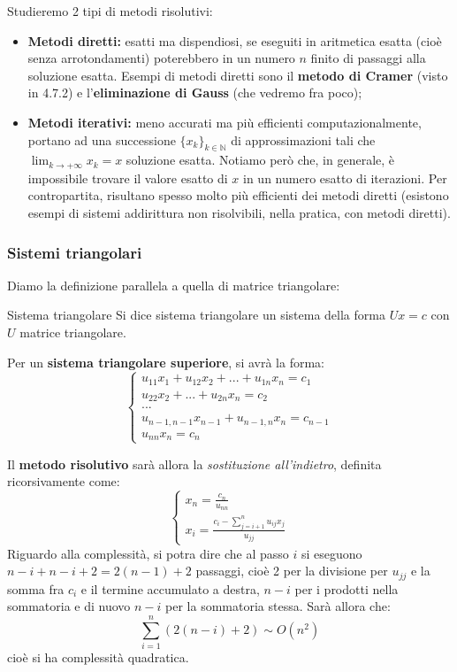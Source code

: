 \documentclass[a4paper,11pt]{article}
\begin{document}
Studieremo 2 tipi di metodi risolutivi:
\begin{itemize}
	\item \textbf{Metodi diretti:} esatti ma dispendiosi, se eseguiti in aritmetica esatta (cioè senza arrotondamenti) poterebbero in un numero $n$ finito di passaggi alla soluzione esatta.
	Esempi di metodi diretti sono il \textbf{metodo di Cramer} (visto in 4.7.2) e l'\textbf{eliminazione di Gauss} (che vedremo fra poco);
	\item \textbf{Metodi iterativi:} meno accurati ma più efficienti computazionalmente, portano ad una successione $\{x_k\}_{k \in \mathbb{N}}$ di approssimazioni tali che $ \lim_{k \rightarrow +\infty} x_k = x$ soluzione esatta. Notiamo però che, in generale, è impossibile trovare il valore esatto di $x$ in un numero esatto di iterazioni. Per contropartita, risultano spesso molto più efficienti dei metodi diretti (esistono esempi di sistemi addirittura non risolvibili, nella pratica, con metodi diretti). 
\end{itemize}

\subsubsection{Sistemi triangolari}
Diamo la definizione parallela a quella di matrice triangolare:
\begin{definition}{Sistema triangolare}
	Si dice sistema triangolare un sistema della forma $Ux = c$ con $U$ matrice triangolare.
\end{definition}

Per un \textbf{sistema triangolare superiore}, si avrà la forma:
\[
	\begin{cases}
		u_{11} x_1 + u_{12} x_2 + ... + u_{1n} x_n = c_1 \\ 	
		u_{22} x_2 + ... + u_{2n} x_n = c_2 \\ 	
		... \\
		u_{n-1,n-1} x_{n-1} + u_{n-1,n} x_n = c_{n-1} \\
		u_{nn} x_n = c_n
	\end{cases}
\]

Il \textbf{metodo risolutivo} sarà allora la \textit{sostituzione all'indietro}, definita ricorsivamente come:
\[
	\begin{cases}
		x_n = \frac{c_n}{u_{nn}} \\ 
		x_i = \frac{ c_i - \sum_{j = i + 1}^n u_{ij} x_j }{u_{jj}}
	\end{cases}
\]
Riguardo alla complessità, si potra dire che al passo $i$ si eseguono $n - i + n - i + 2 = 2(n - 1) + 2$ passaggi, cioè 2 per la divisione per $u_{jj}$ e la somma fra $c_i$ e il termine accumulato a destra, $n - i$ per i prodotti nella sommatoria e di nuovo $n - i$ per la sommatoria stessa.
Sarà allora che:
$$
\sum_{i = 1}^n \left( 2(n - i) + 2 \right) \sim O(n^2)
$$
cioè si ha complessità quadratica.
\end{document}
